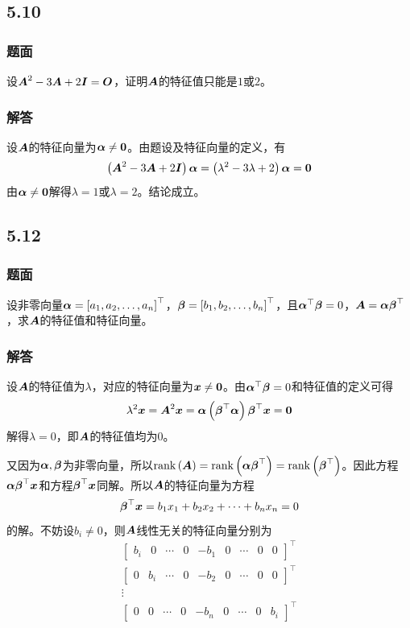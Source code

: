 \documentclass{beamer}
\begin{document}
\subsection*{5.10}
\begin{frame}
    \frametitle{题面}
    设\(\boldsymbol{A}^2-3\boldsymbol{A}+2\boldsymbol{I}=\boldsymbol{O}\)，证明\(\boldsymbol{A}\)的特征值只能是\(1\)或\(2\)。
\end{frame}

\begin{frame}
    \frametitle{解答}
    设\(\boldsymbol{A}\)的特征向量为\(\boldsymbol{\alpha}\neq\boldsymbol{0}\)。由题设及特征向量的定义，有
    \begin{equation*}
        \left( \boldsymbol{A}^2-3\boldsymbol{A}+2\boldsymbol{I} \right)\boldsymbol{\alpha}=\left( \lambda^2-3\lambda+2 \right)\boldsymbol{\alpha}=\boldsymbol{0}
    \end{equation*}
    \pause
    由\(\boldsymbol{\alpha}\neq\boldsymbol{0}\)解得\(\lambda=1\)或\(\lambda=2\)。结论成立。
\end{frame}

\subsection*{5.12}
\begin{frame}
    \frametitle{题面}
    设非零向量\(\boldsymbol{\alpha}=\left[ {a}_1,{a}_2,\dots,{a}_{n} \right]^\top\)，\(\boldsymbol{\beta}=\left[ {b}_1,{b}_2,\dots,{b}_{n} \right]^\top\)，且\(\boldsymbol{\alpha}^\top\boldsymbol{\beta}=0\)，\(\boldsymbol{A}=\boldsymbol{\alpha}\boldsymbol{\beta}^\top\)，求\(\boldsymbol{A}\)的特征值和特征向量。
\end{frame}

\begin{frame}[allowframebreaks]
    \frametitle{解答}

    设\(\boldsymbol{A}\)的特征值为\(\lambda\)，对应的特征向量为\(\boldsymbol{x}\neq\boldsymbol{0}\)。由\(\boldsymbol{\alpha}^\top\boldsymbol{\beta}=0\)和特征值的定义可得
    \begin{equation*}
        \lambda^2\boldsymbol{x}=\boldsymbol{A}^2\boldsymbol{x}=\boldsymbol{\alpha}\left( \boldsymbol{\beta}^\top\boldsymbol{\alpha} \right)\boldsymbol{\beta}^\top\boldsymbol{x}=\boldsymbol{0}
    \end{equation*}
    解得\(\lambda=0\)，即\(\boldsymbol{A}\)的特征值均为\(0\)。

    又因为\(\boldsymbol{\alpha},\boldsymbol{\beta}\)为非零向量，所以\(\mathrm{rank}\left( \boldsymbol{A} \right)=\mathrm{rank}\left( \boldsymbol{\alpha}\boldsymbol{\beta}^\top \right)=\mathrm{rank}\left( \boldsymbol{\beta}^\top \right)\)。因此方程\(\boldsymbol{\alpha}\boldsymbol{\beta}^\top\boldsymbol{x}\)和方程\(\boldsymbol{\beta}^\top\boldsymbol{x}\)同解。所以\(\boldsymbol{A}\)的特征向量为方程
    \begin{equation*}
        \boldsymbol{\beta}^\top\boldsymbol{x}=b_1x_1+b_2x_2+\dots+b_nx_n=0
    \end{equation*}
    的解。不妨设\(b_i\neq0\)，则\(\boldsymbol{A}\)线性无关的特征向量分别为
    \begin{gather*}
        \begin{bmatrix}b_i&0&\cdots&0&-b_1&0&\cdots&0&0\end{bmatrix}^\top\\
        \begin{bmatrix}0&b_i&\cdots&0&-b_2&0&\cdots&0&0\end{bmatrix}^\top\\
        \vdots\\
        \begin{bmatrix}0&0&\cdots&0&-b_n&0&\cdots&0&b_i\end{bmatrix}^\top
    \end{gather*}

\end{frame}
\end{document}
